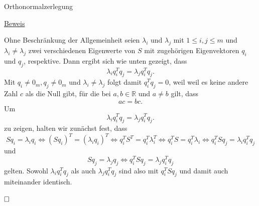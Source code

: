 \documentclass[
  8pt,
  ignorenonframetext,
]{beamer}
\begin{document}
\begin{frame}{Orthonormalzerlegung}
\protect\hypertarget{orthonormalzerlegung-1}{}
\footnotesize

\underline{Beweis}

Ohne Beschränkung der Allgemeinheit seien \(\lambda_i\) und
\(\lambda_j\) mit \(1 \le i,j \le m\) und \(\lambda_i \neq \lambda_j\)
zwei verschiedenen Eigenwerte von \(S\) mit zugehörigen Eigenvektoren
\(q_i\) und \(q_j\), respektive. Dann ergibt sich wie unten gezeigt,
dass \begin{equation}
\lambda_i q_i^Tq_j = \lambda_j q_i^Tq_j.
\end{equation} Mit \(q_i \neq 0_m, q_j \neq 0_m\) und
\(\lambda_i \neq \lambda_j\) folgt damit \(q_i^Tq_j = 0\), weil weil es
keine andere Zahl \(c\) als die Null gibt, für die bei
\(a,b\in \mathbb{R}\) und \(a \neq b\) gilt, dass \begin{equation}
ac = bc.
\end{equation} Um \begin{equation}
\lambda_i q_i^Tq_j = \lambda_j q_i^Tq_j.
\end{equation} zu zeigen, halten wir zunächst fest, dass
\begin{equation}
                 Sq_i       = \lambda_i q_i      
\Leftrightarrow (Sq_i)^T    = (\lambda_i q_i)^T  
\Leftrightarrow q_i^TS^T    = q_i^T \lambda_i^T  
\Leftrightarrow q_i^T S     = q_i^T \lambda_i   
\Leftrightarrow q_i^T Sq_j  = \lambda_i q_i^Tq_j 
\end{equation} und \begin{equation}
                     Sq_j = \lambda_j q_j
\Leftrightarrow q_i^TSq_j = \lambda_j q_i^Tq_j
\end{equation} gelten. Sowohl \(\lambda_i q_i^Tq_j\) als auch
\(\lambda_j q_i^Tq_j\) sind also mit \(q_i^T Sq_j\) und damit auch
miteinander identisch.

\(\hfill \Box\)
\end{frame}
\end{document}
